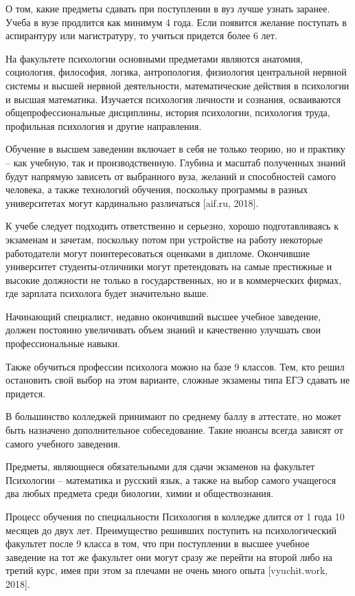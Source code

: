 О том, какие предметы сдавать при поступлении в вуз лучше узнать заранее. Учеба в вузе продлится как минимум 4 года. Если появится желание поступать в аспирантуру или магистратуру, то учиться придется более 6 лет.

На факультете психологии основными предметами являются анатомия, социология, философия, логика, антропология, физиология центральной нервной системы и высшей нервной деятельности, математические действия в психологии и высшая математика. Изучается психология личности и сознания, осваиваются общепрофессиональные дисциплины, история психологии, психология труда, профильная психология и другие направления.

Обучение в высшем заведении включает в себя не только теорию, но и практику – как учебную, так и производственную. Глубина и масштаб полученных знаний будут напрямую зависеть от выбранного вуза, желаний и способностей самого человека, а также технологий обучения, поскольку программы в разных университетах могут кардинально различаться [aif.ru, 2018].

К учебе следует подходить ответственно и серьезно, хорошо подготавливаясь к экзаменам и зачетам, поскольку потом при устройстве на работу некоторые работодатели могут поинтересоваться оценками в дипломе. Окончившие университет студенты-отличники могут претендовать на самые престижные и высокие должности не только в государственных, но и в коммерческих фирмах, где зарплата психолога будет значительно выше.

Начинающий специалист, недавно окончивший высшее учебное заведение, должен постоянно увеличивать объем знаний и качественно улучшать свои профессиональные навыки.

Также обучиться профессии психолога можно на базе 9 классов. Тем, кто решил остановить свой выбор на этом варианте, сложные экзамены типа ЕГЭ сдавать не придется.

В большинство колледжей принимают по среднему баллу в аттестате, но может быть назначено дополнительное собеседование. Такие нюансы всегда зависят от самого учебного заведения.

Предметы, являющиеся обязательными для сдачи экзаменов на факультет Психологии – математика и русский язык, а также на выбор самого учащегося два любых предмета среди биологии, химии и обществознания.

Процесс обучения по специальности Психология в колледже длится от 1 года 10 месяцев до двух лет. Преимущество решивших поступить на психологический факультет после 9 класса в том, что при поступлении в высшее учебное заведение на тот же факультет они могут сразу же перейти на второй либо на третий курс, имея при этом за плечами не очень много опыта [vyuchit.work, 2018].

